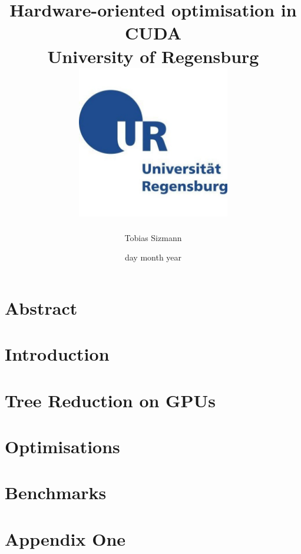 \documentclass[12pt, twoside]{report}
\title{
    {Hardware-oriented optimisation in CUDA} \\
    {\large University of Regensburg} \\
    {\includegraphics[width = 0.5\textwidth]{ur_logo.jpg}}
}
\author{Tobias Sizmann}
\date{day month year}
\begin{document}
\maketitle

\chapter*{Abstract}

\tableofcontents

\chapter{Introduction}


\chapter{Tree Reduction on GPUs}


\chapter{Optimisations}

\chapter{Benchmarks}

\appendix
\chapter{Appendix One}


\printbibliography
\end{document}
